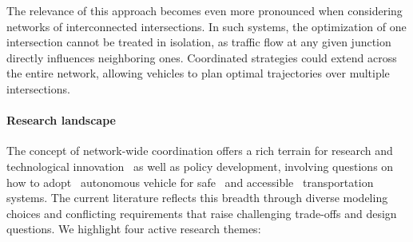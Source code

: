 \documentclass[a4paper]{report}
\theoremstyle{definition}
\theoremstyle{plain}
\begin{document}
The relevance of this approach becomes even more pronounced when considering
networks of interconnected intersections. In such systems, the optimization of
one intersection cannot be treated in isolation, as traffic flow at any given
junction directly influences neighboring ones. Coordinated strategies
could extend across the entire network, allowing vehicles to plan optimal
trajectories over multiple intersections.

\paragraph{Research landscape}

The concept of network-wide coordination offers a rich terrain for research and
technological
innovation~\cite{padmajaExplorationIssuesChallenges2023,yangAutonomousDrivingV2X2022}
as well as policy development, involving questions on how to
adopt~\cite{naisehTrustRiskPerception2025} autonomous vehicle for
safe~\cite{hilaryMakingAutomatedVehicles2022} and
accessible~\cite{fatimaEquityIssuesAssociated2024} transportation systems.
%
The current literature reflects this breadth through diverse modeling choices
and conflicting requirements that raise challenging trade-offs and design
questions.
We highlight four active research themes:
\end{document}
